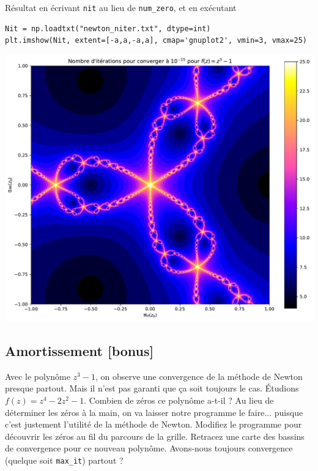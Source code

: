 \documentclass{book}
\newcommand{\inline}[1]{\texttt{#1}}
\begin{document}
\begin{correction}
Résultat en écrivant \inline{nit} au lieu de \inline{num_zero}, et en exécutant
\begin{verbatim}
Nit = np.loadtxt("newton_niter.txt", dtype=int)
plt.imshow(Nit, extent=[-a,a,-a,a], cmap='gnuplot2', vmin=3, vmax=25)
\end{verbatim}
\includegraphics[width=0.95\linewidth]{TD2/newton_newton_niter.a1.pdf}
\end{correction}

\subsection{Amortissement [bonus]}

Avec le polynôme $z^3-1$, on observe une convergence de la méthode de Newton presque partout. Mais il n'est pas garanti que ça soit toujours le cas. Étudions $f(z)=z^4-2z^2-1$. Combien de zéros ce polynôme a-t-il ? Au lieu de déterminer les zéros à la main, on va laisser notre programme le faire... puisque c'est justement l'utilité de la méthode de Newton. Modifiez le programme pour découvrir les zéros au fil du parcours de la grille. Retracez une carte des bassins de convergence pour ce nouveau polynôme. Avons-nous toujours convergence (quelque soit \inline{max_it}) partout ?\\
\end{document}
